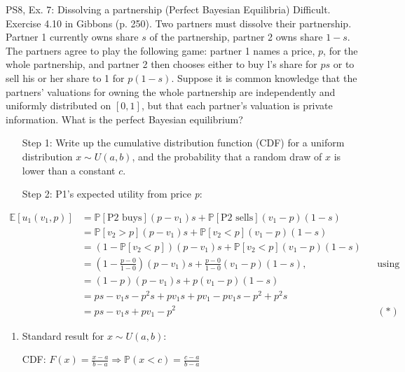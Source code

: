 \begin{frame}{PS8, Ex. 7: Dissolving a partnership (Perfect Bayesian Equilibria)}
    Difficult. Exercise 4.10 in Gibbons (p. 250). Two partners must dissolve their partnership. Partner 1 currently owns share $s$ of the partnership, partner 2 owns share $1-s$. The partners agree to play the following game: partner 1 names a price, $p$, for the whole partnership, and partner 2 then chooses either to buy l's share for $ps$ or to sell his or her share to 1 for $p(1-s)$. Suppose it is common knowledge that the partners' valuations for owning the whole partnership are independently and uniformly distributed on $[0,1]$, but that each partner's valuation is private information. What is the perfect Bayesian equilibrium?\vspace{-11pt}
    \begin{multicols}{2}
      \begin{itemize}
        \item[Step 1:] Write up the cumulative distribution function (CDF) for a uniform distribution $x\sim U(a, b)$, and the probability that a random draw of $x$ is lower than a constant $c$.
        \item[Step 2:] P1's expected utility from price \textit{p}:
      \end{itemize}\vspace{-8pt}
      \begin{align*}
          \mathbb{E}[u_1(v_1,p)]
            &=\mathbb{P}[\text{P2 buys}](p-v_1)s+\mathbb{P}[\text{P2 sells}](v_1-p)(1-s)\\
            &=\mathbb{P}[v_2>p](p-v_1)s+\mathbb{P}[v_2<p](v_1-p)(1-s)\\
            &=(1-\mathbb{P}[v_2<p])(p-v_1)s+\mathbb{P}[v_2<p](v_1-p)(1-s)\\
            &=\left(1-\frac{p-0}{1-0}\right)(p-v_1)s+\frac{p-0}{1-0}(v_1-p)(1-s),&&\text{using the CDF}\\
            &=\left(1-p\right)(p-v_1)s+p(v_1-p)(1-s)\\
            &=ps-v_1s-p^2s+pv_1s+pv_1-pv_1s-p^2+p^2s\\
            &=ps-v_1s+pv_1-p^2%
            &&(*)
      \end{align*}
      \vfill\null\columnbreak
      \begin{enumerate}
        \item Standard result for $x\sim U(a, b):$
        \item[CDF:] $F(x)=\frac{x-a}{b-a}\Rightarrow\mathbb{P}(x<c)=\frac{c-a}{b-a}$
      \end{enumerate}
      \vfill\null
    \end{multicols}
\end{frame}
